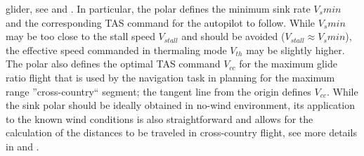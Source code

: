 \documentclass{ifacconf}
\begin{document}
glider, see \cite{Piggott:1997} and \cite{FAA:2011}. In particular, the polar defines the
minimum sink rate $V_{s}min$ and the corresponding TAS command for the autopilot to
follow. While $V_{s}min$ may be too close to the stall speed $V_{stall}$ and should be
avoided ($V_{stall} \approx V_{s}min$), the effective speed commanded in thermaling mode
$V_{th}$ may be slightly higher. The polar also defines the optimal TAS command  $V_{cc}$
for the maximum glide ratio flight that is used by the navigation task in planning for
the maximum range ''cross-country`` segment; the tangent line from the origin defines
$V_{cc}$. While the sink polar should be ideally obtained in no-wind environment, its
application to the known wind conditions is also straightforward and allows for the
calculation of the distances to be traveled in cross-country flight, see more details in
\cite{Piggott:1997} and \cite{FAA:2011}.
\end{document}
